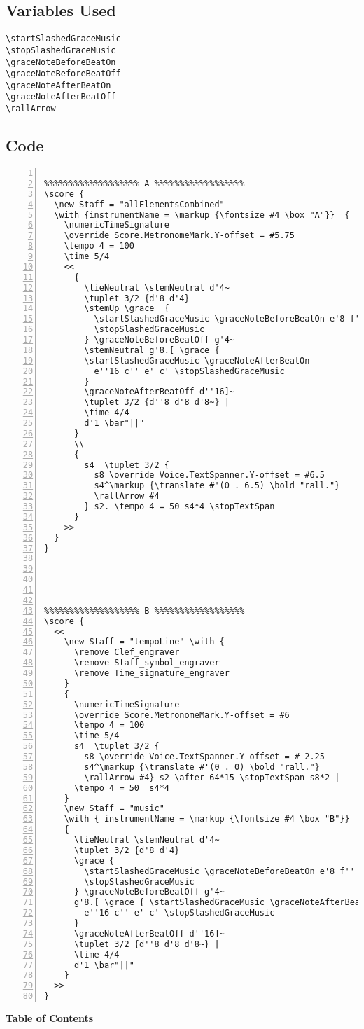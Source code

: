 \subsection{Variables Used}
\begin{verbatim}
\startSlashedGraceMusic
\stopSlashedGraceMusic
\graceNoteBeforeBeatOn
\graceNoteBeforeBeatOff
\graceNoteAfterBeatOn
\graceNoteAfterBeatOff
\rallArrow

\end{verbatim}
\subsection{Code}
\begin{Verbatim}[numbers=left,xleftmargin=5mm]

%%%%%%%%%%%%%%%%%%% A %%%%%%%%%%%%%%%%%%
\score {
  \new Staff = "allElementsCombined"
  \with {instrumentName = \markup {\fontsize #4 \box "A"}}  {
    \numericTimeSignature
    \override Score.MetronomeMark.Y-offset = #5.75
    \tempo 4 = 100
    \time 5/4
    <<
      {
        \tieNeutral \stemNeutral d'4~
        \tuplet 3/2 {d'8 d'4}
        \stemUp \grace  {
          \startSlashedGraceMusic \graceNoteBeforeBeatOn e'8 f''
          \stopSlashedGraceMusic
        } \graceNoteBeforeBeatOff g'4~
        \stemNeutral g'8.[ \grace { 
        \startSlashedGraceMusic \graceNoteAfterBeatOn
          e''16 c'' e' c' \stopSlashedGraceMusic
        }
        \graceNoteAfterBeatOff d''16]~
        \tuplet 3/2 {d''8 d'8 d'8~} |
        \time 4/4
        d'1 \bar"||"
      }
      \\
      {
        s4  \tuplet 3/2 {
          s8 \override Voice.TextSpanner.Y-offset = #6.5
          s4^\markup {\translate #'(0 . 6.5) \bold "rall."}
          \rallArrow #4
        } s2. \tempo 4 = 50 s4*4 \stopTextSpan
      }
    >>
  }
}





%%%%%%%%%%%%%%%%%%% B %%%%%%%%%%%%%%%%%%
\score {
  <<
    \new Staff = "tempoLine" \with {
      \remove Clef_engraver
      \remove Staff_symbol_engraver
      \remove Time_signature_engraver
    }
    {
      \numericTimeSignature
      \override Score.MetronomeMark.Y-offset = #6
      \tempo 4 = 100
      \time 5/4
      s4  \tuplet 3/2 {
        s8 \override Voice.TextSpanner.Y-offset = #-2.25
        s4^\markup {\translate #'(0 . 0) \bold "rall."}
        \rallArrow #4} s2 \after 64*15 \stopTextSpan s8*2 |
      \tempo 4 = 50  s4*4
    }
    \new Staff = "music"
    \with { instrumentName = \markup {\fontsize #4 \box "B"}}
    {
      \tieNeutral \stemNeutral d'4~
      \tuplet 3/2 {d'8 d'4}
      \grace {
        \startSlashedGraceMusic \graceNoteBeforeBeatOn e'8 f''
        \stopSlashedGraceMusic
      } \graceNoteBeforeBeatOff g'4~
      g'8.[ \grace { \startSlashedGraceMusic \graceNoteAfterBeatOn
        e''16 c'' e' c' \stopSlashedGraceMusic
      }
      \graceNoteAfterBeatOff d''16]~
      \tuplet 3/2 {d''8 d'8 d'8~} |
      \time 4/4
      d'1 \bar"||"
    }
  >>
}
\end{Verbatim}

\hyperref[sec:toc]{\textbf{Table of Contents}}

\vfill \break

